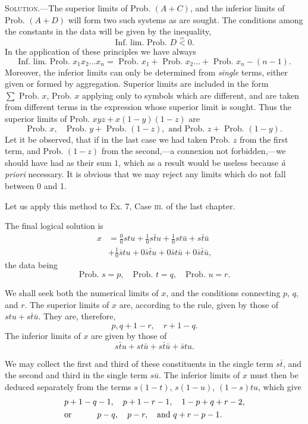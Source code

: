 \documentclass[oneside]{book}
\begin{document}
\textsc{Solution.}---The superior limits of Prob. $(A + C)$, and the
inferior limits of Prob. $(A + D)$ will form two such systems as are
sought. The conditions among the constants in the data will be
given by the inequality,
\[
  \text{Inf. lim. Prob. } D \stackrel{=}{<} 0.
\]
In the application of these principles we have always
\[
  \text{Inf. lim. Prob. } x_1 x_2 \dotsc x_n = \text{ Prob. } x_1
+ \text{ Prob. }x_2 \dotsc + \text{ Prob. }x_n - (n-1).
\]
Moreover, the inferior limits can only be determined from \emph{single}
terms, either given or formed by aggregation. Superior limits
are included in the form $\sum \text{ Prob. }x$, Prob. $x$ applying only to
symbols which are different, and are taken from different terms in
the expression whose superior limit is sought. Thus the superior
limits of Prob. $xyz + x(1-y)(1-z)$ are
\[
  \text{Prob. }x,\quad \text{Prob. }y + \text{ Prob. }(1-z),
  \text{ and Prob. }z + \text{ Prob. }(1-y).
\]
Let it be observed, that if in the last case we had taken Prob. $z$
from the first term, and Prob. $(1-z)$ from the second,---a connexion
not forbidden,---we should have had as their sum $1$, which
as a result would be useless because \textit{\`{a} priori} necessary. It is
obvious that we may reject any limits which do not fall between
0 and 1.

Let us apply this method to Ex. 7, Case \textsc{iii.} of the last
chapter.

The final logical solution is
\[
\begin{split}
  x &= \frac{0}{0}stu + \frac{1}{0}s\bar{t}u
     + \frac{1}{0}st\bar{u} + s\bar{t}\bar{u}   \\
    &+ \frac{1}{0}\bar{s}tu + 0\bar{s}\bar{t}u
     + 0\bar{s}t\bar{u} + 0\bar{s}\bar{t}\bar{u},
\end{split}
\]
the data being
\[
 \text{Prob. }s = p,\quad \text{Prob. }t = q,\quad \text{Prob. }u = r.
\]

We shall seek both the numerical limits of $x$, and the conditions
connecting $p$, $q$, and $r$.
The superior limits of $x$ are, according to the rule, given by
those of $stu + s\bar{t}\bar{u}$. They are, therefore,
\[
  p, q + 1 - r,\quad r + 1 - q.
\]
The inferior limits of $x$ are given by those of
\[
  s\bar{t}u + st\bar{u} + s\bar{t}\bar{u} + \bar{s}tu.
\]

We may collect the first and third of these constituents in the
single term $s\bar{t}$, and the second and third in the single term $s\bar{u}$.
The inferior limits of $x$ must then be deduced separately from
the terms $s(1-t)$, $s(1-u)$, $(1-s)tu$, which give
\begin{multline*}
  p + 1 - q - 1,\quad p + 1 - r - 1,\quad 1 - p + q + r - 2,   \\
\text{or }\hfill p - q,\quad p - r,\quad \text{and }q + r - p- 1.\hfill
\end{multline*}
\end{document}
